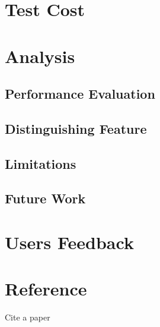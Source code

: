 \documentclass[12pt]{article}
\begin{document}
\section{Test Cost}

\section{Analysis}
\subsection{Performance Evaluation}
\subsection{Distinguishing Feature}
\subsection{Limitations}
\subsection{Future Work}

\section{Users Feedback}



\section{Reference}









\newpage
Cite a paper\cite{DBLP:conf/siggraph/BertalmioSCB00}


\end{document}
